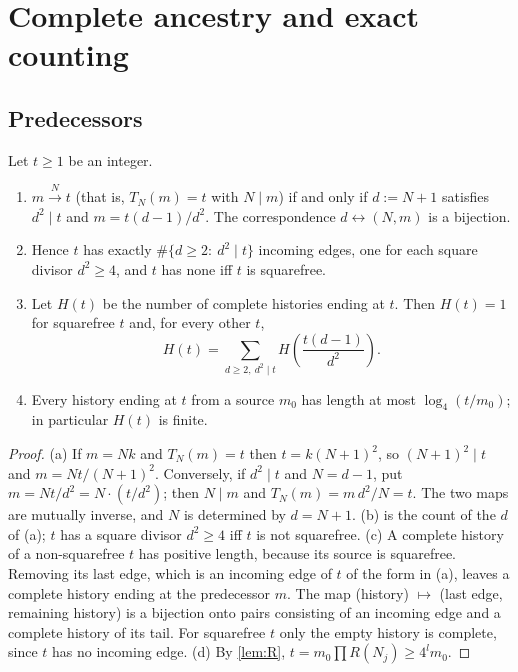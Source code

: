 \section{Complete ancestry and exact counting}\label{sec:ancestry}
\subsection{Predecessors}
\begin{theorem}\label{thm:predecessors}
Let $t\ge1$ be an integer.
\begin{enumerate}[label=(\alph*),itemsep=1pt]
\item $m\xrightarrow{N}t$ (that is, $T_N(m)=t$ with $N\mid m$) if and only if $d:=N+1$ satisfies $d^2\mid t$ and $m=t(d-1)/d^2$. The correspondence $d\leftrightarrow(N,m)$ is a bijection.
\item Hence $t$ has exactly $\#\{d\ge2:\ d^2\mid t\}$ incoming edges, one for each square divisor $d^2\ge4$, and $t$ has none iff $t$ is squarefree.
\item Let $H(t)$ be the number of complete histories ending at $t$. Then $H(t)=1$ for squarefree $t$ and, for every other $t$,
\[
 H(t)=\sum_{d\ge2,\ d^2\mid t}H\!\left(\frac{t(d-1)}{d^2}\right).
\]
\item Every history ending at $t$ from a source $m_0$ has length at most $\log_4(t/m_0)$; in particular $H(t)$ is finite.
\end{enumerate}
\end{theorem}
\begin{proof}
(a) If $m=Nk$ and $T_N(m)=t$ then $t=k(N+1)^2$, so $(N+1)^2\mid t$ and $m=Nt/(N+1)^2$. Conversely, if $d^2\mid t$ and $N=d-1$, put $m=Nt/d^2=N\cdot(t/d^2)$; then $N\mid m$ and $T_N(m)=m\,d^2/N=t$. The two maps are mutually inverse, and $N$ is determined by $d=N+1$.
(b) is the count of the $d$ of (a); $t$ has a square divisor $d^2\ge4$ iff $t$ is not squarefree.
(c) A complete history of a non-squarefree $t$ has positive length, because its source is squarefree. Removing its last edge, which is an incoming edge of $t$ of the form in (a), leaves a complete history ending at the predecessor $m$. The map (history) $\mapsto$ (last edge, remaining history) is a bijection onto pairs consisting of an incoming edge and a complete history of its tail. For squarefree $t$ only the empty history is complete, since $t$ has no incoming edge.
(d) By \cref{lem:R}, $t=m_0\prod R(N_j)\ge4^l m_0$.
\end{proof}

